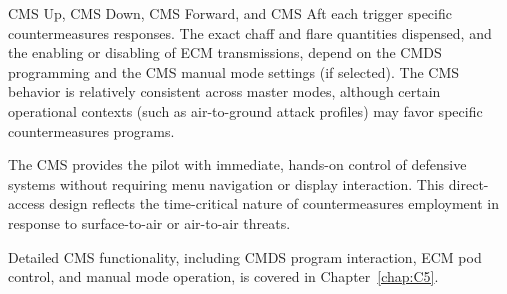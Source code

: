 \documentclass[11pt, a4paper, twoside]{report}
\begin{document}
CMS Up, CMS Down, CMS Forward, and CMS Aft each trigger specific countermeasures responses. The exact chaff and flare quantities dispensed, and the enabling or disabling of ECM transmissions, depend on the CMDS programming and the CMS manual mode settings (if selected). The CMS behavior is relatively consistent across master modes, although certain operational contexts (such as air-to-ground attack profiles) may favor specific countermeasures programs.

The CMS provides the pilot with immediate, hands-on control of defensive systems without requiring menu navigation or display interaction. This direct-access design reflects the time-critical nature of countermeasures employment in response to surface-to-air or air-to-air threats.

Detailed CMS functionality, including CMDS program interaction, ECM pod control, and manual mode operation, is covered in Chapter~\ref{chap:C5}.

\end{document}
